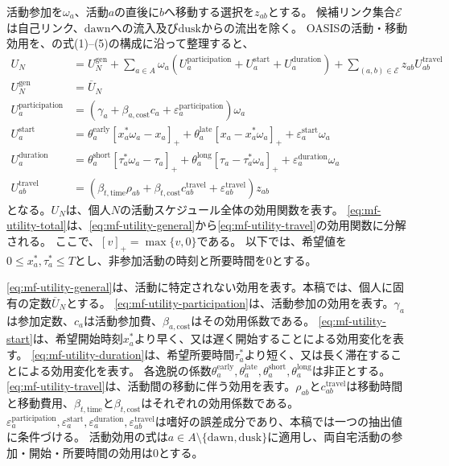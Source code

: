 活動参加を$\omega_a$、活動$a$の直後に$b$へ移動する選択を$z_{ab}$とする。
候補リンク集合$\mathcal E$は自己リンク、$\mathrm{dawn}$への流入及び$\mathrm{dusk}$からの流出を除く。
OASISの活動・移動効用を、\citet{wang2025joint}の式(1)--(5)の構成に沿って整理すると、
\begin{subequations}
\begin{align}
 U_N
 &=U_N^{\mathrm{gen}}
 +\sum_{a\in A} \omega_a \left(
 U_a^{\mathrm{participation}}+U_a^{\mathrm{start}}+U_a^{\mathrm{duration}}\right)
 +\sum_{(a,b)\in\mathcal E}z_{ab} U_{ab}^{\mathrm{travel}}
 \label{eq:mf-utility-total}\\
 U_N^{\mathrm{gen}}&=\overline U_N
 \label{eq:mf-utility-general}\\
 U_a^{\mathrm{participation}}
 &=\left(\gamma_a+\beta_{a,\mathrm{cost}}c_a
 +\varepsilon_a^{\mathrm{participation}}\right)\omega_a
 \label{eq:mf-utility-participation}\\
 U_a^{\mathrm{start}}
 &=\theta_a^{\mathrm{early}}[x_a^*\omega_a-x_a]_+
 +\theta_a^{\mathrm{late}}[x_a-x_a^*\omega_a]_+
 +\varepsilon_a^{\mathrm{start}}\omega_a
 \label{eq:mf-utility-start}\\
 U_a^{\mathrm{duration}}
 &=\theta_a^{\mathrm{short}}[\tau_a^*\omega_a-\tau_a]_+
 +\theta_a^{\mathrm{long}}[\tau_a-\tau_a^*\omega_a]_+
 +\varepsilon_a^{\mathrm{duration}}\omega_a
 \label{eq:mf-utility-duration}\\
 U_{ab}^{\mathrm{travel}}
 &=\left(\beta_{t,\mathrm{time}}\rho_{ab}
 +\beta_{t,\mathrm{cost}}c_{ab}^{\mathrm{travel}}
 +\varepsilon_{ab}^{\mathrm{travel}}\right)z_{ab}
 \label{eq:mf-utility-travel}
\end{align}
\end{subequations}
となる。$U_N$は、個人$N$の活動スケジュール全体の効用関数を表す。
\eqref{eq:mf-utility-total}は、\eqref{eq:mf-utility-general}から\eqref{eq:mf-utility-travel}の効用関数に分解される。
ここで、$[v]_+=\max\{v,0\}$である。
以下では、希望値を$0\le x_a^*,\tau_a^*\le T$とし、非参加活動の時刻と所要時間を0とする。

\eqref{eq:mf-utility-general}は、活動に特定されない効用を表す。本稿では、個人に固有の定数$\overline U_N$とする。
\eqref{eq:mf-utility-participation}は、活動参加の効用を表す。$\gamma_a$は参加定数、$c_a$は活動参加費、$\beta_{a,\mathrm{cost}}$はその効用係数である。
\eqref{eq:mf-utility-start}は、希望開始時刻$x_a^*$より早く、又は遅く開始することによる効用変化を表す。
\eqref{eq:mf-utility-duration}は、希望所要時間$\tau_a^*$より短く、又は長く滞在することによる効用変化を表す。
各逸脱の係数$\theta_a^{\mathrm{early}},\theta_a^{\mathrm{late}},\theta_a^{\mathrm{short}},\theta_a^{\mathrm{long}}$は非正とする。
\eqref{eq:mf-utility-travel}は、活動間の移動に伴う効用を表す。$\rho_{ab}$と$c_{ab}^{\mathrm{travel}}$は移動時間と移動費用、$\beta_{t,\mathrm{time}}$と$\beta_{t,\mathrm{cost}}$はそれぞれの効用係数である。
$\varepsilon_a^{\mathrm{participation}},\varepsilon_a^{\mathrm{start}},\varepsilon_a^{\mathrm{duration}},\varepsilon_{ab}^{\mathrm{travel}}$は嗜好の誤差成分であり、本稿では一つの抽出値に条件づける。
活動効用の式は$a\in A\setminus\{\mathrm{dawn},\mathrm{dusk}\}$に適用し、両自宅活動の参加・開始・所要時間の効用は0とする。

